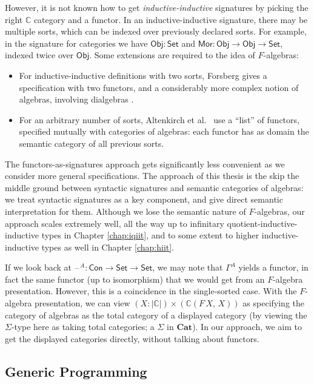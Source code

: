 \documentclass[12pt,a4paper,twoside,openany]{book}
\theoremstyle{remark}
\theoremstyle{definition}
\theoremstyle{theorem}
\newcommand{\ms}[1]{\mathsf{#1}}
\newcommand{\mbb}[1]{\mathbb{#1}}
\newcommand{\mbf}[1]{\mathbf{#1}}
\newcommand{\Con}{\mathsf{Con}}
\newcommand{\blank}{\mathord{\hspace{1pt}\text{--}\hspace{1pt}}}
\newcommand{\Set}{\mathsf{Set}}
\newcommand{\Mor}{\ms{Mor}}
\newcommand{\Obj}{\ms{Obj}}
\begin{document}
However, it is not known how to get \emph{inductive-inductive} signatures by
picking the right $\mbb{C}$ category and a functor. In an inductive-inductive
signature, there may be multiple sorts, which can be indexed over previously
declared sorts. For example, in the signature for categories we have $\Obj :
\Set$ and $\Mor : \Obj \to \Obj \to \Set$, indexed twice over $\Obj$. Some
extensions are required to the idea of $F$-algebras:
\begin{itemize}
\item
  For inductive-inductive definitions with two sorts, Forsberg gives a
  specification with two functors, and a considerably more complex notion of
  algebras, involving dialgebras \cite{forsberg-phd}.
\item
  For an arbitrary number of sorts, Altenkirch et
  al.\ \cite{altenkirch18qiit} use a ``list'' of functors, specified mutually
  with categories of algebras: each functor has as domain the semantic category
  of all previous sorts.
\end{itemize}

The functors-as-signatures approach gets significantly less convenient as we
consider more general specifications. The approach of this thesis is the skip the
middle ground between syntactic signatures and semantic categories of algebras:
we treat syntactic signatures as a key component, and give direct semantic
interpretation for them. Although we lose the semantic nature of $F$-algebras,
our approach scales extremely well, all the way up to infinitary
quotient-inductive-inductive types in Chapter \ref{chap:iqiit}, and to some
extent to higher inductive-inductive types as well in Chapter \ref{chap:hiit}.

If we look back at $\blank^A : \Con \to \Set \to \Set$, we may note that
$\Gamma^A$ yields a functor, in fact the same functor (up to isomorphism) that
we would get from an $F$-algebra presentation. However, this is a coincidence in
the single-sorted case. With the $F$-algebra presentation, we can view $(X :
|\mbb{C}|) \times (\mbb{C}(F\,X,\,X))$ as specifying the category of algebras as
the total category of a displayed category (by viewing the $\Sigma$-type here as
taking total categories; a $\Sigma$ in $\mbf{Cat}$). In our approach, we aim to
get the displayed categories directly, without talking about functors.

\subsection{Generic Programming}
\label{sec:generic-programming}
\end{document}
